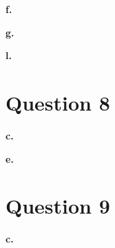 \documentclass[11pt]{article}
\begin{document}
	\vspace{2mm}
	\textbf{f.}
	
	\vspace{2mm}
	\textbf{g.}
	
	\vspace{2mm}
	\textbf{l.}
	
	
	\newpage
	\section*{Question 8}
	
	\textbf{c.}
	
	\vspace{2mm}
	\textbf{e.}
	
	\newpage
	\section*{Question 9}
	
	\textbf{c.}
	
	

	
\end{document}
